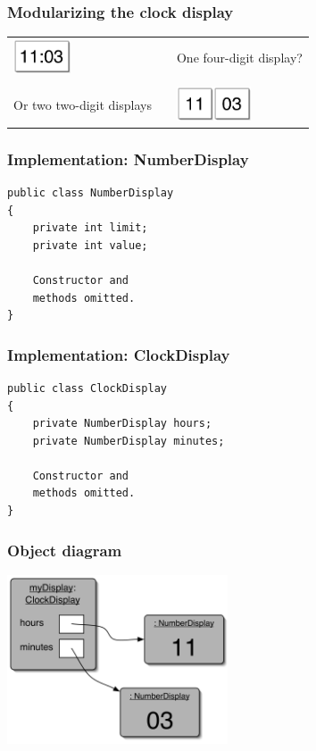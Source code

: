 \documentclass{beamer}
\begin{document}
\begin{frame}
\frametitle{Modularizing the clock display}
\begin{tabular}{lll}
\begin{minipage}{3cm}
\includegraphics[height=1cm,keepaspectratio]{./figures/cl1} \end{minipage} & \mbox{}\hspace{1cm} & One four-digit display?\\
\mbox{}\\
\begin{minipage}{3cm}
Or two two-digit displays
\end{minipage}& & \begin{minipage}{3cm}\includegraphics[height=1cm,keepaspectratio]{./figures/cl2}\includegraphics[height=1cm,keepaspectratio]{./figures/cl3}\end{minipage}
\end{tabular}
\end{frame}

\begin{frame}[fragile]
\frametitle{Implementation: NumberDisplay}
\begin{lstlisting}
public class NumberDisplay
{
    private int limit;
    private int value;

    Constructor and
    methods omitted.
}
\end{lstlisting}
\end{frame}

\begin{frame}[fragile]
\frametitle{Implementation: ClockDisplay}
\begin{lstlisting}
public class ClockDisplay
{
    private NumberDisplay hours;
    private NumberDisplay minutes;

    Constructor and
    methods omitted.
}
\end{lstlisting}
\end{frame}

\begin{frame}
\frametitle{Object diagram}
\begin{center}
\includegraphics[height=5cm, keepaspectratio]{./figures/object}
\end{center}
\end{frame}
\end{document}
